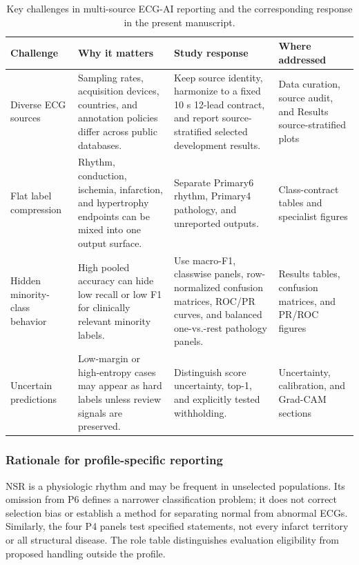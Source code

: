 \documentclass[life,article,submit,moreauthors]{Definitions/mdpi}
\begin{document}
\begin{table}[htbp]
\caption{Key challenges in multi-source ECG-AI reporting and the corresponding response in the present manuscript.\label{tab:challengeposition}}
\centering
\small
\begin{tabular}{@{}p{.15\linewidth}p{.26\linewidth}p{.31\linewidth}p{.18\linewidth}@{}}
\toprule
\textbf{Challenge} & \textbf{Why it matters} & \textbf{Study response} & \textbf{Where addressed} \\
\midrule
Diverse ECG sources & Sampling rates, acquisition devices, countries, and annotation policies differ across public databases. & Keep source identity, harmonize to a fixed 10 s 12-lead contract, and report source-stratified selected development results. & Data curation, source audit, and Results source-stratified plots \\
Flat label compression & Rhythm, conduction, ischemia, infarction, and hypertrophy endpoints can be mixed into one output surface. & Separate Primary6 rhythm, Primary4 pathology, and unreported outputs. & Class-contract tables and specialist figures \\
Hidden minority-class behavior & High pooled accuracy can hide low recall or low F1 for clinically relevant minority labels. & Use macro-F1, classwise panels, row-normalized confusion matrices, ROC/PR curves, and balanced one-vs.-rest pathology panels. & Results tables, confusion matrices, and PR/ROC figures \\
Uncertain predictions & Low-margin or high-entropy cases may appear as hard labels unless review signals are preserved. & Distinguish score uncertainty, top-1, and explicitly tested withholding. & Uncertainty, calibration, and Grad-CAM sections \\
\bottomrule
\end{tabular}
\end{table}


\subsubsection{Rationale for profile-specific reporting}
NSR is a physiologic rhythm and may be frequent in unselected populations. Its omission from P6 defines a narrower classification problem; it does not correct selection bias or establish a method for separating normal from abnormal ECGs. Similarly, the four P4 panels test specified statements, not every infarct territory or all structural disease. The role table distinguishes evaluation eligibility from proposed handling outside the profile.
\end{document}
